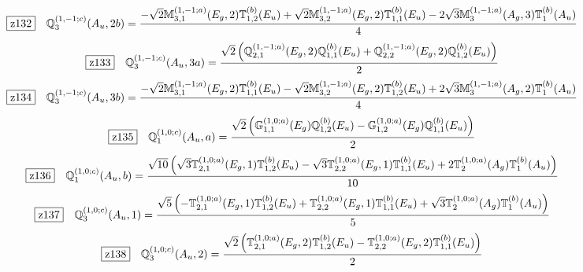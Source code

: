 \documentclass[fleqn,10pt,landscape]{jsarticle}
\begin{document}
\begin{dmath*}
\hspace*{3mm}\fbox{z132}\quad \mathbb{Q}_{3}^{(1,-1;c)}(A_{u},2b)=\frac{- \sqrt{2} \mathbb{M}_{3,1}^{(1,-1;a)}(E_{g},2) \mathbb{T}_{1,2}^{(b)}(E_{u}) + \sqrt{2} \mathbb{M}_{3,2}^{(1,-1;a)}(E_{g},2) \mathbb{T}_{1,1}^{(b)}(E_{u}) - 2 \sqrt{3} \mathbb{M}_{3}^{(1,-1;a)}(A_{g},3) \mathbb{T}_{1}^{(b)}(A_{u})}{4}
\end{dmath*}
\begin{dmath*}
\hspace*{3mm}\fbox{z133}\quad \mathbb{Q}_{3}^{(1,-1;c)}(A_{u},3a)=\frac{\sqrt{2} \left(\mathbb{Q}_{2,1}^{(1,-1;a)}(E_{g},2) \mathbb{Q}_{1,1}^{(b)}(E_{u}) + \mathbb{Q}_{2,2}^{(1,-1;a)}(E_{g},2) \mathbb{Q}_{1,2}^{(b)}(E_{u})\right)}{2}
\end{dmath*}
\begin{dmath*}
\hspace*{3mm}\fbox{z134}\quad \mathbb{Q}_{3}^{(1,-1;c)}(A_{u},3b)=\frac{- \sqrt{2} \mathbb{M}_{3,1}^{(1,-1;a)}(E_{g},2) \mathbb{T}_{1,1}^{(b)}(E_{u}) - \sqrt{2} \mathbb{M}_{3,2}^{(1,-1;a)}(E_{g},2) \mathbb{T}_{1,2}^{(b)}(E_{u}) + 2 \sqrt{3} \mathbb{M}_{3}^{(1,-1;a)}(A_{g},2) \mathbb{T}_{1}^{(b)}(A_{u})}{4}
\end{dmath*}
\begin{dmath*}
\hspace*{3mm}\fbox{z135}\quad \mathbb{Q}_{1}^{(1,0;c)}(A_{u},a)=\frac{\sqrt{2} \left(\mathbb{G}_{1,1}^{(1,0;a)}(E_{g}) \mathbb{Q}_{1,2}^{(b)}(E_{u}) - \mathbb{G}_{1,2}^{(1,0;a)}(E_{g}) \mathbb{Q}_{1,1}^{(b)}(E_{u})\right)}{2}
\end{dmath*}
\begin{dmath*}
\hspace*{3mm}\fbox{z136}\quad \mathbb{Q}_{1}^{(1,0;c)}(A_{u},b)=\frac{\sqrt{10} \left(\sqrt{3} \mathbb{T}_{2,1}^{(1,0;a)}(E_{g},1) \mathbb{T}_{1,2}^{(b)}(E_{u}) - \sqrt{3} \mathbb{T}_{2,2}^{(1,0;a)}(E_{g},1) \mathbb{T}_{1,1}^{(b)}(E_{u}) + 2 \mathbb{T}_{2}^{(1,0;a)}(A_{g}) \mathbb{T}_{1}^{(b)}(A_{u})\right)}{10}
\end{dmath*}
\begin{dmath*}
\hspace*{3mm}\fbox{z137}\quad \mathbb{Q}_{3}^{(1,0;c)}(A_{u},1)=\frac{\sqrt{5} \left(- \mathbb{T}_{2,1}^{(1,0;a)}(E_{g},1) \mathbb{T}_{1,2}^{(b)}(E_{u}) + \mathbb{T}_{2,2}^{(1,0;a)}(E_{g},1) \mathbb{T}_{1,1}^{(b)}(E_{u}) + \sqrt{3} \mathbb{T}_{2}^{(1,0;a)}(A_{g}) \mathbb{T}_{1}^{(b)}(A_{u})\right)}{5}
\end{dmath*}
\begin{dmath*}
\hspace*{3mm}\fbox{z138}\quad \mathbb{Q}_{3}^{(1,0;c)}(A_{u},2)=\frac{\sqrt{2} \left(\mathbb{T}_{2,1}^{(1,0;a)}(E_{g},2) \mathbb{T}_{1,2}^{(b)}(E_{u}) - \mathbb{T}_{2,2}^{(1,0;a)}(E_{g},2) \mathbb{T}_{1,1}^{(b)}(E_{u})\right)}{2}
\end{dmath*}
\end{document}
